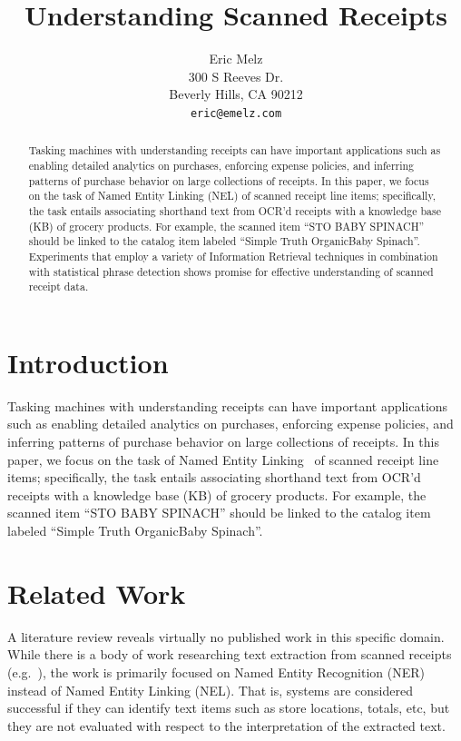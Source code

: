 \documentclass[11pt,a4paper]{article}
\title{Understanding Scanned Receipts}
\author{Eric Melz \\
  300 S Reeves Dr. \\
  Beverly Hills, CA 90212 \\
  \texttt{eric@emelz.com}
}
\date{}
\begin{document}
\maketitle
\begin{abstract}
Tasking machines with understanding receipts can have important
applications such as enabling detailed analytics on purchases,
enforcing expense policies, and inferring patterns of purchase
behavior on large collections of receipts.  In this paper, we focus on
the task of Named Entity Linking (NEL) of 
scanned receipt line items; specifically, the task entails
associating shorthand text from OCR’d receipts with a knowledge base
(KB) of grocery products.  For example, the scanned item ``STO BABY
SPINACH'' should be linked to the catalog item labeled ``Simple Truth
Organic\texttrademark Baby Spinach''.  Experiments that employ a variety of
Information Retrieval techniques in combination with statistical
phrase detection shows promise for effective understanding of scanned
receipt data.

\end{abstract}

\section{Introduction}

Tasking machines with understanding receipts can have important
applications such as enabling detailed analytics on purchases,
enforcing expense policies, and inferring patterns of purchase
behavior on large collections of receipts.  In this paper, we focus on
the task of Named Entity Linking~\cite{Hachey:2012} of
scanned receipt line items; specifically, the task entails
associating shorthand text from OCR’d receipts with a knowledge base
(KB) of grocery products.  For example, the scanned item ``STO BABY
SPINACH'' should be linked to the catalog item labeled ``Simple Truth
Organic\texttrademark Baby Spinach''.  

\section{Related Work}

A literature review reveals virtually no published work in this
specific domain.  While there is a body of work researching text
extraction from scanned receipts (e.g.~\citealp{Huang:2019}), the work is primarily
focused on Named Entity Recognition (NER) instead of Named Entity
Linking (NEL).  That is, systems are considered successful if they can
identify text items such as store locations, totals, etc, but they are
not evaluated with respect to the interpretation of the extracted
text.
\end{document}
